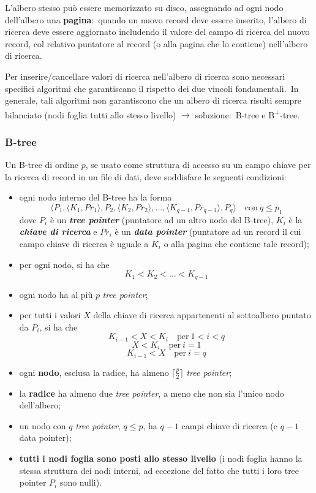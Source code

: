 L'albero stesso può essere memorizzato su disco, assegnando ad ogni nodo dell'albero una \textbf{pagina}:\ quando un nuovo record deve essere inserito, l'albero di ricerca deve essere aggiornato includendo il valore del campo di ricerca del nuovo record, col relativo puntatore al record (o alla pagina che lo contiene) nell'albero di ricerca.

Per inserire/cancellare valori di ricerca nell'albero di ricerca sono necessari specifici algoritmi che garantiscano il rispetto dei due vincoli fondamentali.\
In generale, tali algoritmi non garantiscono che un albero di ricerca risulti sempre bilanciato (nodi foglia tutti allo stesso livello) $\rightarrow$ soluzione:\ B-tree e B\textsuperscript{+}-tree.\

\subsubsection{B-tree}

Un B-tree di ordine $p$, se usato come struttura di accesso su un campo chiave per la ricerca di record in un file di dati, deve soddisfare le seguenti condizioni:\
\begin{itemize}
	\item ogni nodo interno del B-tree ha la forma \[\langle P_1, \langle K_1, Pr_1\rangle, P_2, \langle K_2, Pr_2\rangle, \dots, \langle K_{q-1}, Pr_{q-1}\rangle, P_q\rangle \quad  \mathrm{con}\ q \leq p_1\] dove $P_i$ è un \textbf{\textit{tree pointer}} (puntatore ad un altro nodo del B-tree), $K_i$ è la \textbf{\textit{chiave di ricerca}} e $Pr_i$ è un \textbf{\textit{data pointer}} (puntatore ad un record il cui campo chiave di ricerca è uguale a $K_i$ o alla pagina che contiene tale record);
	\item per ogni nodo, si ha che \[K_1 < K_2 < \dots < K_{q-1}\]
	\item ogni nodo ha al più $p$ \textit{tree pointer};
	\item per tutti i valori $X$ della chiave di ricerca appartenenti al sottoalbero puntato da $P_i$, si ha che \[K_{i-1} < X < K_i\quad\mathrm{per}\ 1 < i < q\] \[X < K_i\quad\mathrm{per}\ i = 1\] \[K_{i-1} < X\quad\mathrm{per}\ i = q\]
	\item ogni \textbf{nodo}, esclusa la radice, ha almeno $\lceil \frac{p}{2}\rceil$ \textit{tree pointer};
	\item la \textbf{radice} ha almeno due \textit{tree pointer}, a meno che non sia l'unico nodo dell'albero;
	\item un nodo con $q$ \textit{tree pointer}, $q \leq p$, ha $q-1$ campi chiave di ricerca (e $q-1$ data pointer);
	\item \textbf{tutti i nodi foglia sono posti allo stesso livello} (i nodi foglia hanno la stessa struttura dei nodi interni, ad eccezione del fatto che tutti i loro tree pointer $P_i$ sono nulli).
\end{itemize}

